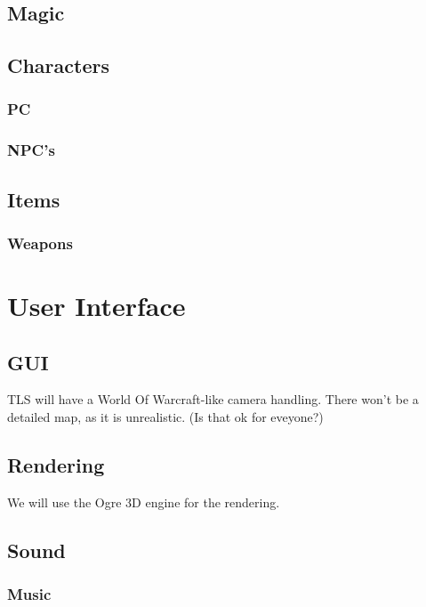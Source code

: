 \documentclass[a4paper]{report}
\begin{document}
	\chapter{Magic}

	\chapter{Characters}

		\section{PC}

		\section{NPC's}

	\chapter{Items}

		\section{Weapons}

\part{User Interface}

	\chapter{GUI}

		TLS will have a World Of Warcraft-like camera handling. There won't be a detailed map, as it is unrealistic. (Is that ok for eveyone?)

	\chapter{Rendering}

		We will use the Ogre 3D engine for the rendering.

	\chapter{Sound}

		\section{Music}
\end{document}
